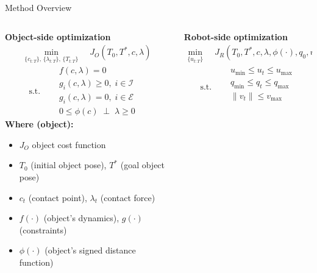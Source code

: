 \documentclass[10pt, aspectratio=169]{beamer}
\begin{document}
\begin{frame}{Method Overview}
\begin{columns}[T,onlytextwidth]
    \begin{column}{0.5\textwidth}
        \textbf{Object-side optimization}
        \[\begin{aligned}
        \min_{\{c_{t:T}\},\,\{\lambda_{t:T}\},\,\{T_{t:T}\}} \;\; 
        & J_{O}(T_{0}, T^*, c, \lambda)
        \end{aligned}\]
        \[
        \text{s.t.}\quad
        \begin{aligned}
        & f(c,\lambda) = 0 \\
        & g_i(c,\lambda) \ge 0,\; i\in\mathcal{I} \\
        & g_i(c,\lambda) = 0,\; i\in\mathcal{E} \\
        & 0 \le \phi(c) \;\perp\; \lambda \ge 0 \quad
        \end{aligned}
        \]
        \textbf{Where (object):}
        \begin{itemize}\itemsep0.1em
            \item $J_{O}$ object cost function
            \item $T_0$ (initial object pose), $T^*$ (goal object pose)
            \item $c_t$ (contact point), $\lambda_t$ (contact force)
            \item $f(\cdot)$ (object's dynamics), $g(\cdot)$ (constraints)
            \item $\phi(\cdot)$ (object's signed distance function)
        \end{itemize}
    \end{column}
    
    \begin{column}{0.5\textwidth}
        \textbf{Robot-side optimization}
        \[\begin{aligned}
        \min_{\{u_{t:T}\}} \;\; 
        & J_{R}(T_0, T^*, c, \lambda, \phi(\cdot), q_{0}, u_{0})
        \end{aligned}\]
        \[ \text{s.t.}\quad
        \begin{aligned}
        & u_{\min}\!\le u_t \le u_{\max} \\
        & q_{\min}\!\le q_t \le q_{\max} \\
        & \|v_t\|\le v_{\max} \\
        \\
        \end{aligned}\]
        

\end{column}
\end{columns}
\end{frame}
\end{document}
